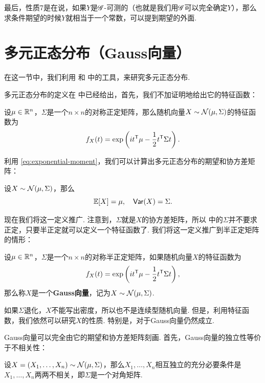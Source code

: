 最后，性质7是在说，如果$Y$是$\mathscr{G}$-可测的（也就是我们用$\mathscr{G}$可以完全确定$Y$），那么求条件期望的时候$Y$就相当于一个常数，可以提到期望的外面. 

\section{多元正态分布（Gauss向量）}\label{sec:multivariate-normal}

在这一节中，我们利用 和 中的工具，来研究多元正态分布.

多元正态分布的定义在 中已经给出，首先，我们不加证明地给出它的特征函数：

\begin{theorem}\label{theorem:multivariate-normal-characteristic-function}
设$\mu\in\mathbb{R}^n$，$\Sigma$是一个$n\times n$的对称正定矩阵，那么随机向量$X\sim\mathcal{N}(\mu,\Sigma)$的特征函数为
\[f_X(t)=\exp\left(it^{\mathsf{T}}\mu-\frac{1}{2}t^{\mathsf{T}}\Sigma t\right).\]
\end{theorem}

利用 \eqref{eq:exponential-moment}，我们可以计算出多元正态分布的期望和协方差矩阵：

\begin{proposition}\label{proposition:multivariate-normal-expectation-covariance}
设$X\sim\mathcal{N}(\mu,\Sigma)$，那么
\[\mathbb{E}[X]=\mu,\quad\mathsf{Var}(X)=\Sigma.\]
\end{proposition}

现在我们将这一定义推广. 注意到，$\Sigma$就是$X$的协方差矩阵，所以 中的$\Sigma$并不要求正定，只要半正定就可以定义一个特征函数了. 我们将这一定义推广到半正定矩阵的情形：

\begin{definition}[Gauss向量]\label{definition:gauss-vector}
设$\mu\in\mathbb{R}^n$，$\Sigma$是一个$n\times n$的对称半正定矩阵，如果随机向量$X$的特征函数为
\[f_X(t)=\exp\left(it^{\mathsf{T}}\mu-\frac{1}{2}t^{\mathsf{T}}\Sigma t\right),\]
那么称$X$是一个\textbf{Gauss向量}，记为$X\sim\mathcal{N}(\mu,\Sigma)$.
\end{definition}

如果$\Sigma$退化，$X$不能写出密度，所以也不是连续型随机向量. 但是，利用特征函数，我们依然可以研究$X$的性质. 特别是，对于Gauss向量仍然成立. 

Gauss向量可以完全由它的期望和协方差矩阵刻画. 首先，Gauss向量的独立性等价于不相关性：

\begin{theorem}\label{theorem:gauss-vector-independence}
设$X=(X_1,\dots,X_n)\sim\mathcal{N}(\mu,\Sigma)$，那么$X_1,\dots,X_n$相互独立的充分必要条件是$X_1,\dots,X_n$两两不相关，即$\Sigma$是一个对角矩阵. 
\end{theorem}

